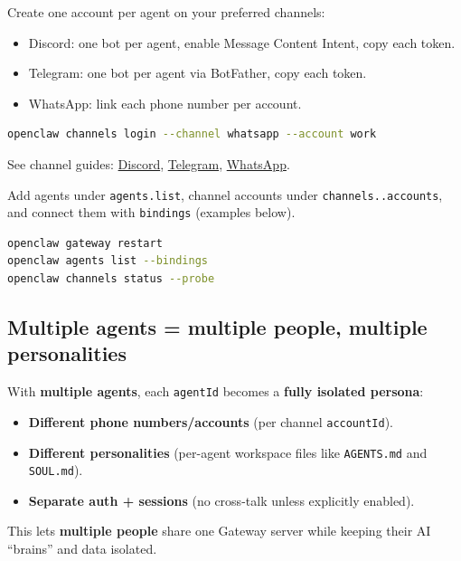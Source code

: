 Create one account per agent on your preferred channels:

\begin{itemize}
  \item Discord: one bot per agent, enable Message Content Intent, copy each token.
  \item Telegram: one bot per agent via BotFather, copy each token.
  \item WhatsApp: link each phone number per account.
\end{itemize}


\begin{lstlisting}[language=bash]
openclaw channels login --channel whatsapp --account work
\end{lstlisting}


See channel guides: \href{/channels/discord}{Discord}, \href{/channels/telegram}{Telegram}, \href{/channels/whatsapp}{WhatsApp}.



Add agents under \texttt{agents.list}, channel accounts under \texttt{channels..accounts}, and connect them with \texttt{bindings} (examples below).



\begin{lstlisting}[language=bash]
openclaw gateway restart
openclaw agents list --bindings
openclaw channels status --probe
\end{lstlisting}



\subsection{Multiple agents = multiple people, multiple personalities}


With \textbf{multiple agents}, each \texttt{agentId} becomes a \textbf{fully isolated persona}:

\begin{itemize}
  \item \textbf{Different phone numbers/accounts} (per channel \texttt{accountId}).
  \item \textbf{Different personalities} (per-agent workspace files like \texttt{AGENTS.md} and \texttt{SOUL.md}).
  \item \textbf{Separate auth + sessions} (no cross-talk unless explicitly enabled).
\end{itemize}


This lets \textbf{multiple people} share one Gateway server while keeping their AI “brains” and data isolated.

